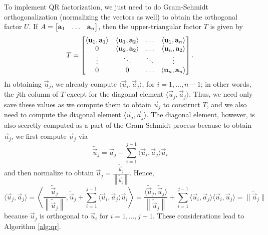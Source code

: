 \documentclass{homework}
\begin{document}
	\question To implement QR factorization, we just need to do Gram-Schmidt orthogonalization (normalizing the vectors as well) to obtain the orthogonal factor $U$. If $A = \left[\begin{matrix}\mathbf{a}_1 &\hdots & \mathbf{a}_n\end{matrix}\right]$, then the upper-triangular factor $T$ is given by
	\begin{equation*}
		T = \left[\begin{matrix}\langle \mathbf{u}_1, \mathbf{a}_1\rangle & \langle\mathbf{u}_1, \mathbf{a}_2\rangle & \hdots & \langle\mathbf{u}_1, \mathbf{a}_n\rangle \\ 0 & \langle\mathbf{u}_2, \mathbf{a}_2\rangle & \hdots & \langle\mathbf{u}_n, \mathbf{a}_2\rangle \\ \vdots & \ddots & \ddots & \vdots \\ 0 & 0 & \hdots & \langle\mathbf{u}_n, \mathbf{a}_n \rangle\end{matrix}\right].
	\end{equation*}
	In obtaining $\vec{u}_j$, we already compute $\langle\vec{u}_i,\vec{a}_j\rangle$, for $i = 1,\dots, n-1$; in other words, the $j$th column of $T$ except for the diagonal element $\langle \vec{u}_j, \vec{a}_j\rangle$. Thus, we need only save these values as we compute them to obtain $\vec{u}_j$ to construct $T$, and we also need to compute the diagonal element $\langle\vec{u}_j,\vec{a}_j\rangle$. The diagonal element, however, is also secretly computed as a part of the Gram-Schmidt process because to obtain $\vec{u}_j$, we first compute $\widetilde{\vec{u}}_j$ via
	\begin{equation*}
		\widetilde{\vec{u}}_j = \vec{a}_j - \sum_{i=1}^{j-1} \langle\vec{u}_i, \vec{a}_j\rangle\vec{u}_i
	\end{equation*}
	and then normalize to obtain $\vec{u}_j = \frac{\widetilde{\vec{u}}_j}{\left\lVert\widetilde{\vec{u}}_j\right\rVert}$. Hence,
	\begin{equation*}
		\langle \vec{u}_j, \vec{a}_j\rangle = \left\langle\frac{\widetilde{\vec{u}}_j}{\left\lVert\widetilde{\vec{u}}_j\right\rVert}, \widetilde{\vec{u}}_j + \sum_{i=1}^{j-1}\langle\vec{u}_i,\vec{a}_j\rangle\vec{u}_i\right\rangle = \frac{\langle\widetilde{\vec{u}}_j, \widetilde{\vec{u}}_j\rangle}{\left\lVert\widetilde{\vec{u}}_j\right\rVert} + \sum_{i=1}^{j-1}\langle \vec{u}_i,\vec{a}_j\rangle\langle\vec{u}_i, \vec{u}_j\rangle = \lVert \widetilde{\vec{u}}_j\rVert
	\end{equation*}
	because $\vec{u}_j$ is orthogonal to $\vec{u}_i$ for $i = 1,\dots, j-1$. These considerations lead to Algorithm \ref{alg:qr}.
	
\end{document}
